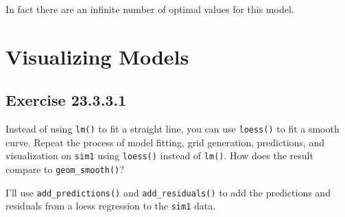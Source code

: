 \documentclass[]{book}
\newenvironment{Shaded}{\begin{snugshade}}{\end{snugshade}}
\newcommand{\CommentTok}[1]{\textcolor[rgb]{0.56,0.35,0.01}{\textit{#1}}}
\newcommand{\DataTypeTok}[1]{\textcolor[rgb]{0.13,0.29,0.53}{#1}}
\newcommand{\DecValTok}[1]{\textcolor[rgb]{0.00,0.00,0.81}{#1}}
\newcommand{\KeywordTok}[1]{\textcolor[rgb]{0.13,0.29,0.53}{\textbf{#1}}}
\newcommand{\NormalTok}[1]{#1}
\newcommand{\OperatorTok}[1]{\textcolor[rgb]{0.81,0.36,0.00}{\textbf{#1}}}
\newcommand{\StringTok}[1]{\textcolor[rgb]{0.31,0.60,0.02}{#1}}
\theoremstyle{plain}
\theoremstyle{remark}
\begin{document}
\begin{Shaded}
\end{Shaded}

\begin{Shaded}
\end{Shaded}

In fact there are an infinite number of optimal values for this model.

\hypertarget{visualizing-models}{%
\section{Visualizing Models}\label{visualizing-models}}

\hypertarget{exercise-23.3.3.1}{%
\subsection*{\texorpdfstring{Exercise
{23.3.3.1}}{Exercise 23.3.3.1}}\label{exercise-23.3.3.1}}

Instead of using \texttt{lm()} to fit a straight line, you can use
\texttt{loess()} to fit a smooth curve. Repeat the process of model
fitting, grid generation, predictions, and visualization on
\texttt{sim1} using \texttt{loess()} instead of \texttt{lm()}. How does
the result compare to \texttt{geom\_smooth()}?

I'll use \texttt{add\_predictions()} and \texttt{add\_residuals()} to
add the predictions and residuals from a loess regression to the
\texttt{sim1} data.
\end{document}
